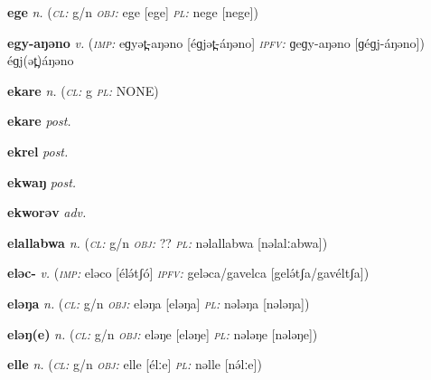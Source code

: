 \newentry
\headword\textbf{ege}  
\ipa{[ege]}
\synpos\textit{n.} 
\class(\textit{\textsc{cl:}} {g/n}
\object\textit{\textsc{obj:}} ege [ege]
\plural\textit{\textsc{pl:}} nege [nege])

\newentry
\headword\textbf{egy-aŋəno}
\ipa{[égj-áŋəno]}
\synpos\textit{v.} 
\imperative(\textit {\textsc{imp:}} eɡyət̪-aŋəno [éɡjət̪-áŋəno] 
\imperfective\textit{\textsc{ipfv:}} ɡeɡy-aŋəno [ɡéɡj-áŋəno])
éɡj(ət̪)áŋəno

\newentry
\headword\textbf{ekare}  
\ipa{[ékáré]}
\synpos\textit{n.} 
\class(\textit{\textsc{cl:}} {g}
\plural\textit{\textsc{pl:}} NONE)

\newentry
\headword\textbf{ekare}  
\ipa{[ékáré]}
\synpos\textit{post.} 

\newentry
\headword\textbf{ekrel}  
\ipa{[ékɾél]}
\synpos\textit{post.} 

\newentry
\headword\textbf{ekwaŋ}  %
\ipa{[ekwaŋ]}
\synpos\textit{post.} 

\newentry
\headword\textbf{ekworəv}  
\ipa{[ekworəv]}
\synpos\textit{adv.} 

\newentry
\headword\textbf{elallabwa}  
\ipa{[elalːabwa]}
\synpos\textit{n.} 
\class(\textit{\textsc{cl:}} {g/n}
\object\textit{\textsc{obj:}} ??
\plural\textit{\textsc{pl:}} nəlallabwa [nəlalːabwa])

\newentry
\headword\textbf{eləc-}
\ipa{[élə́tʃ-]}
\synpos\textit{v.} 
\imperative(\textit {\textsc{imp:}} eləco [élə́tʃó] 
\imperfective\textit{\textsc{ipfv:}} geləca/gavelca [gelə́tʃa/gavéltʃa])

\newentry
\headword\textbf{eləŋa}  
\ipa{[eləŋa]}
\synpos\textit{n.} 
\class(\textit{\textsc{cl:}} {g/n}
\object\textit{\textsc{obj:}} eləŋa [eləŋa]
\plural\textit{\textsc{pl:}} nələŋa [nələŋa])

\newentry
\headword\textbf{eləŋ(e)}  
\ipa{[eləŋ(e)]}
\synpos\textit{n.} 
\class(\textit{\textsc{cl:}} {g/n}
\object\textit{\textsc{obj:}} eləŋe [eləŋe]
\plural\textit{\textsc{pl:}} nələŋe [nələŋe])

\newentry
\headword\textbf{elle}  
\ipa{[élːe]}
\synpos\textit{n.} 
\class(\textit{\textsc{cl:}} {g/n}
\object\textit{\textsc{obj:}} elle [élːe]
\plural\textit{\textsc{pl:}} nəlle [nə́lːe])

